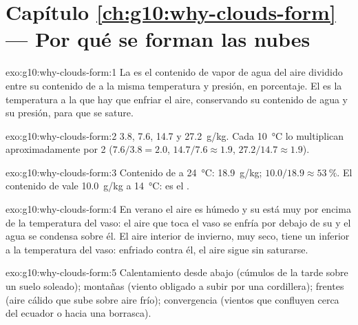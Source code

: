 \section*{Capítulo \ref{ch:g10:why-clouds-form} --- Por qué se forman las nubes}

\begin{solution}{exo:g10:why-clouds-form:1}
La  es el contenido de vapor de agua del aire dividido entre
su contenido de  a la misma temperatura y presión, en porcentaje.
El  es la temperatura a la que hay que enfriar el aire,
conservando su contenido de agua y su presión, para que se sature.
\end{solution}

\begin{solution}{exo:g10:why-clouds-form:2}
\num{3.8}, \num{7.6}, \num{14.7} y \qty{27.2}{g/kg}. Cada
\qty{10}{\degreeCelsius} lo multiplican aproximadamente por 2
($7.6/3.8 = 2.0$, $14.7/7.6 \approx 1.9$, $27.2/14.7 \approx 1.9$).
\end{solution}

\begin{solution}{exo:g10:why-clouds-form:3}
Contenido de  a \qty{24}{\degreeCelsius}: \qty{18.9}{g/kg};
 $10.0/18.9 \approx \qty{53}{\percent}$. El contenido de
 vale \qty{10.0}{g/kg} a \qty{14}{\degreeCelsius}: es el .
\end{solution}

\begin{solution}{exo:g10:why-clouds-form:4}
En verano el aire es húmedo y su  está muy por encima de la
temperatura del vaso: el aire que toca el vaso se enfría por debajo de su
 y el agua se condensa sobre él. El aire interior de invierno,
muy seco, tiene un  inferior a la temperatura del vaso:
enfriado contra él, el aire sigue sin saturarse.
\end{solution}

\begin{solution}{exo:g10:why-clouds-form:5}
Calentamiento desde abajo (cúmulos de la tarde sobre un suelo soleado);
montañas (viento obligado a subir por una cordillera); frentes (aire cálido
que sube sobre aire frío); convergencia (vientos que confluyen cerca del
ecuador o hacia una borrasca).
\end{solution}

